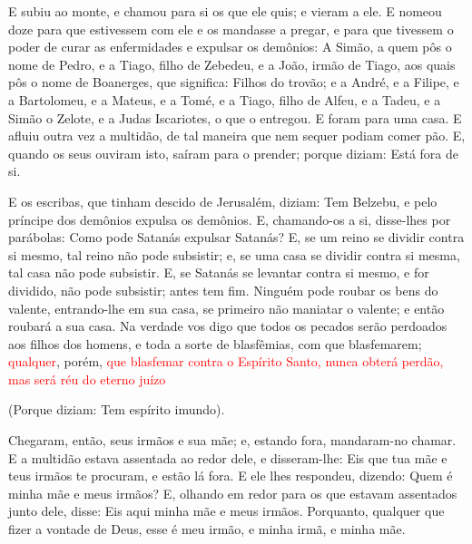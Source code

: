 E subiu ao monte, e chamou para si os que ele quis; e vieram a
ele. E nomeou doze para que estivessem com ele e os mandasse
a pregar, e para que tivessem o poder de curar as
enfermidades e expulsar os demônios: A Simão, a quem pôs o
nome de Pedro, e a Tiago, filho de Zebedeu, e a João, irmão
de Tiago, aos quais pôs o nome de Boanerges, que significa: Filhos
do trovão; e a André, e a Filipe, e a Bartolomeu, e a Mateus,
e a Tomé, e a Tiago, filho de Alfeu, e a Tadeu, e a Simão o Zelote,
e a Judas Iscariotes, o que o entregou. E foram para
uma casa. E afluiu outra vez a multidão, de tal maneira que nem
sequer podiam comer pão. E, quando os seus ouviram isto,
saíram para o prender; porque diziam: Está fora de si.

E os escribas, que tinham descido de Jerusalém, diziam: Tem
Belzebu, e pelo príncipe dos demônios expulsa os demônios. E,
chamando-os a si, disse-lhes por parábolas: Como pode Satanás
expulsar Satanás? E, se um reino se dividir contra si mesmo,
tal reino não pode subsistir; e, se uma casa se dividir
contra si mesma, tal casa não pode subsistir. E, se Satanás
se levantar contra si mesmo, e for dividido, não pode subsistir;
antes tem fim. Ninguém pode roubar os bens do valente,
entrando-lhe em sua casa, se primeiro não maniatar o valente; e
então roubará a sua casa. Na verdade vos digo que todos os
pecados serão perdoados aos filhos dos homens, e toda a sorte de
blasfêmias, com que blasfemarem; \textcolor{red}{qualquer}, porém,
\textcolor{red}{que blasfemar contra o Espírito Santo, nunca obterá perdão,
mas será réu do eterno juízo}

 (Porque diziam: Tem espírito imundo).

Chegaram, então, seus irmãos e sua mãe; e, estando fora,
mandaram-no chamar. E a multidão estava assentada ao redor
dele, e disseram-lhe: Eis que tua mãe e teus irmãos te procuram, e
estão lá fora. E ele lhes respondeu, dizendo: Quem é minha
mãe e meus irmãos? E, olhando em redor para os que estavam
assentados junto dele, disse: Eis aqui minha mãe e meus irmãos.
Porquanto, qualquer que fizer a vontade de Deus, esse é meu
irmão, e minha irmã, e minha mãe.

\medskip

